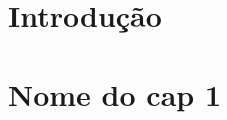 \documentclass[
	oldfontcommands,
	sumario=tradicional,
	12pt,      %
	openright, %
	oneside,   %
	a4paper,   %
	english, %
	brazil   %
	]{00-configs/imecc-unicamp}
\begin{document}
		\chapter{Introdução} \label{cap_intro} %
		
		
		\chapter{Nome do cap 1} \label{cap_ideia_do_nome}
		
		
		
		
		\postextual
		
		
	
\end{document}

